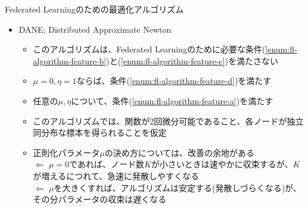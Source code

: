 \documentclass[dvipdfmx,notheorems,t]{beamer}
\begin{document}
\begin{frame}{Federated Learningのための最適化アルゴリズム}

\begin{itemize}
	\item DANE; Distributed Approximate Newton
	\begin{itemize}
		\item このアルゴリズムは、Federated Learningのために必要な条件(\ref{enum:fl-algorithm-feature-b})と(\ref{enum:fl-algorithm-feature-c})を満たさない
		\item $\mu = 0, \eta = 1$ならば、条件(\ref{enum:fl-algorithm-feature-d})を満たす
		\item 任意の$\mu, \eta$について、条件(\ref{enum:fl-algorithm-feature-a})を満たす
		\newline
		
		\item このアルゴリズムでは、関数が2回微分可能であること、各ノードが独立同分布な標本を得られることを仮定
		\newline
		
		\item 正則化パラメータ$\mu$の決め方については、改善の余地がある \\
		$\Leftarrow$ $\mu = 0$であれば、ノード数$K$が小さいときは速やかに収束するが、$K$が増えるにつれて、急速に発散しやすくなる \\
		$\Leftarrow$ $\mu$を大きくすれば、アルゴリズムは安定する(発散しづらくなる)が、その分パラメータの収束は遅くなる
	\end{itemize}
\end{itemize}

\end{frame}
\end{document}
